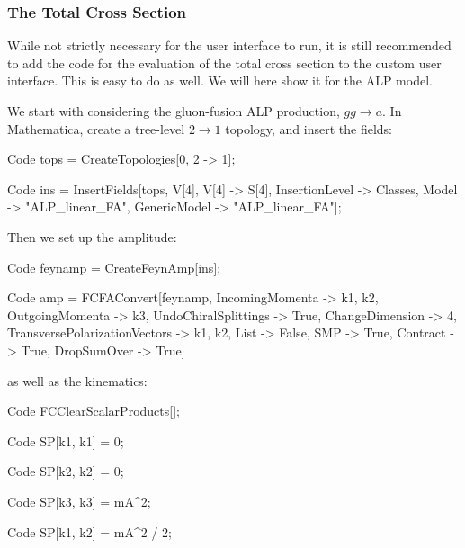\documentclass[12pt]{article}
\begin{document}
\begin{figure}[tbh]
\begin{minipage}{.485\textwidth}
  \label{fig:alpratio}
\end{minipage}
\end{figure}

\subsubsection{The Total Cross Section} \label{sec:alptotxsec} 
While not strictly necessary for the user interface to run, it is still recommended to add the code for the evaluation of the total cross section to the custom user interface. This is easy to do as well. We will here show it for the ALP model. 

We start with considering the gluon-fusion ALP production, $gg \rightarrow a$. In Mathematica, create a tree-level $2 \rightarrow 1$ topology, and insert the fields: 
\begin{mmaCell}{Code}
tops = CreateTopologies[0, 2 -> 1];
\end{mmaCell}
\begin{mmaCell}{Code}
ins = InsertFields[tops, {V[4], V[4]} -> {S[4]}, InsertionLevel -> {Classes}, Model -> "ALP_linear_FA", GenericModel -> "ALP_linear_FA"];
\end{mmaCell}
Then we set up the amplitude: 
\begin{mmaCell}{Code}
feynamp = CreateFeynAmp[ins]; 
\end{mmaCell}
\begin{mmaCell}{Code}
amp = FCFAConvert[feynamp, IncomingMomenta -> {k1, k2}, OutgoingMomenta -> {k3}, UndoChiralSplittings -> True, ChangeDimension -> 4, TransversePolarizationVectors -> {k1, k2}, List -> False, SMP -> True, Contract -> True, DropSumOver -> True] 
\end{mmaCell}
as well as the kinematics: 
\begin{mmaCell}{Code}
FCClearScalarProducts[]; 
\end{mmaCell}
\begin{mmaCell}{Code}
SP[k1, k1] = 0; 
\end{mmaCell}
\begin{mmaCell}{Code}
SP[k2, k2] = 0; 
\end{mmaCell}
\begin{mmaCell}{Code}
SP[k3, k3] = mA^2; 
\end{mmaCell}
\begin{mmaCell}{Code}
SP[k1, k2] = mA^2 / 2; 
\end{mmaCell}
\end{document}
